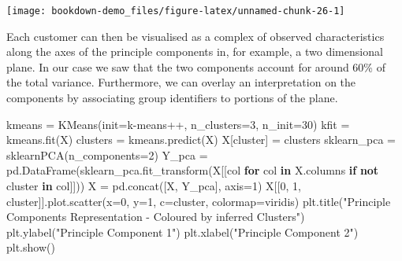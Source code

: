 \documentclass[]{tufte-book}
\newenvironment{Shaded}{}{}
\newcommand{\ControlFlowTok}[1]{\textcolor[rgb]{0.00,0.44,0.13}{\textbf{#1}}}
\newcommand{\DecValTok}[1]{\textcolor[rgb]{0.25,0.63,0.44}{#1}}
\newcommand{\KeywordTok}[1]{\textcolor[rgb]{0.00,0.44,0.13}{\textbf{#1}}}
\newcommand{\NormalTok}[1]{#1}
\newcommand{\OperatorTok}[1]{\textcolor[rgb]{0.40,0.40,0.40}{#1}}
\newcommand{\StringTok}[1]{\textcolor[rgb]{0.25,0.44,0.63}{#1}}
\theoremstyle{definition}
\theoremstyle{definition}
\theoremstyle{definition}
\theoremstyle{remark}
\begin{document}
\texttt{[image: bookdown-demo\_files/figure-latex/unnamed-chunk-26-1]}

Each customer can then be visualised as a complex of observed characteristics along the axes of the principle components in, for example, a two dimensional plane. In our case we saw that the two components account for around 60\% of the total variance. Furthermore, we can overlay an interpretation on the components by associating group identifiers to portions of the plane.

\begin{Shaded}
\begin{Highlighting}[]
\NormalTok{kmeans }\OperatorTok{=}\NormalTok{ KMeans(init}\OperatorTok{=}\StringTok{\textquotesingle{}k{-}means++\textquotesingle{}}\NormalTok{, n\_clusters}\OperatorTok{=}\DecValTok{3}\NormalTok{, n\_init}\OperatorTok{=}\DecValTok{30}\NormalTok{)}
\NormalTok{kfit }\OperatorTok{=}\NormalTok{ kmeans.fit(X)}
\NormalTok{clusters }\OperatorTok{=}\NormalTok{ kmeans.predict(X)}
\NormalTok{X[}\StringTok{\textquotesingle{}cluster\textquotesingle{}}\NormalTok{] }\OperatorTok{=}\NormalTok{ clusters}
\NormalTok{sklearn\_pca }\OperatorTok{=}\NormalTok{ sklearnPCA(n\_components}\OperatorTok{=}\DecValTok{2}\NormalTok{)}
\NormalTok{Y\_pca }\OperatorTok{=}\NormalTok{ pd.DataFrame(sklearn\_pca.fit\_transform(X[[col }\ControlFlowTok{for}\NormalTok{ col }\KeywordTok{in}\NormalTok{ X.columns }\ControlFlowTok{if}
                                         \KeywordTok{not} \StringTok{\textquotesingle{}cluster\textquotesingle{}} \KeywordTok{in}\NormalTok{ col]]))}
\NormalTok{X }\OperatorTok{=}\NormalTok{ pd.concat([X, Y\_pca], axis}\OperatorTok{=}\DecValTok{1}\NormalTok{)}
\NormalTok{X[[}\DecValTok{0}\NormalTok{, }\DecValTok{1}\NormalTok{, }\StringTok{\textquotesingle{}cluster\textquotesingle{}}\NormalTok{]].plot.scatter(x}\OperatorTok{=}\DecValTok{0}\NormalTok{,}
\NormalTok{                      y}\OperatorTok{=}\DecValTok{1}\NormalTok{,}
\NormalTok{                      c}\OperatorTok{=}\StringTok{\textquotesingle{}cluster\textquotesingle{}}\NormalTok{,}
\NormalTok{                      colormap}\OperatorTok{=}\StringTok{\textquotesingle{}viridis\textquotesingle{}}\NormalTok{)}
\NormalTok{plt.title(}\StringTok{"Principle Components Representation {-} Coloured by inferred Clusters"}\NormalTok{)}
\NormalTok{plt.ylabel(}\StringTok{"Principle Component 1"}\NormalTok{)}
\NormalTok{plt.xlabel(}\StringTok{"Principle Component 2"}\NormalTok{)}
\NormalTok{plt.show()}
\end{Highlighting}
\end{Shaded}
\end{document}
